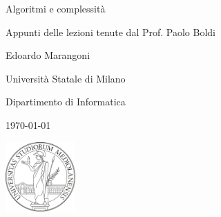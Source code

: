 \documentclass[12pt, a4paper,titlepage]{book}
\numberwithin{theorem}{chapter}
\begin{document}
\pagestyle{fancy}
\renewcommand{\headrulewidth}{0pt} %
\renewcommand{\footrulewidth}{0pt} %
\renewcommand{\chaptermark}[1]{\markboth{#1}{}}
\fancyhead[LE]{\thepage \ \ }
\fancyhead[RO]{\MakeUppercase\leftmark \ \ \thepage}
\fancyfoot[C] {\thepage}


\frontmatter
\begin{titlepage}
	\centering
	\vspace*{6cm}
	\Huge{Algoritmi e complessità}

	\vspace*{0.5cm}

	\Large{Appunti delle lezioni tenute dal Prof. Paolo Boldi}

	\vspace*{2.5cm}

	\Large{Edoardo Marangoni}

	\vspace*{2cm}

	\small{Università Statale di Milano}

	\small{Dipartimento di Informatica}

	\small{\today}

	\vspace*{2cm}
	\includegraphics[width=0.2\textwidth]{images/unimi.png}

\end{titlepage}

\tableofcontents

\mainmatter
\pagestyle{fancy}
\renewcommand{\headrulewidth}{0pt}
\renewcommand{\chaptermark}[1]{\markboth{#1}{}}
\fancyhf{}
\fancyhead[LE]{\thepage \ \ \MakeUppercase\leftmark}
\fancyhead[RE, LO]{\MakeUppercase\chaptertitlename \ \ \thechapter}
\fancyhead[RO]{\rightmark \ \ \thepage}
\fancyfoot[C]{\thepage}







\cleardoublepage

\appendix



\backmatter 


\end{document}
